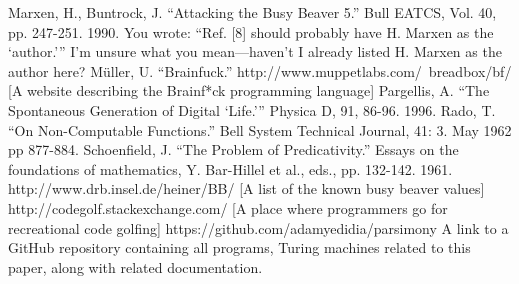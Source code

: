 \documentclass[11pt]{article}
\begin{document}
\begin{thebibliography}{100}
 Marxen, H., Buntrock, J. ``Attacking the Busy Beaver 5.'' Bull EATCS, Vol. 40, pp. 247-251. 1990. {\color{red} You wrote: ``Ref. [8] should probably have H. Marxen as the {`author.'}'' I'm unsure what you mean---haven't I already listed H. Marxen as the author here?}
 M\"uller, U. ``Brainfuck.'' http://www.muppetlabs.com/~breadbox/bf/ [A website describing the Brainf*ck programming language]
 Pargellis, A. ``The Spontaneous Generation of Digital {`Life.'}'' Physica D, 91, 86-96. 1996.
 Rado, T. ``On Non-Computable Functions.'' Bell System Technical Journal, 41: 3. May 1962 pp 877-884.
 Schoenfield, J. ``The Problem of Predicativity.'' Essays on the foundations of mathematics, Y. Bar-Hillel et al., eds., pp. 132-142. 1961.
 http://www.drb.insel.de/heiner/BB/ [A list of the known busy beaver values]
 http://codegolf.stackexchange.com/ [A place where programmers go for recreational code golfing]
 https://github.com/adamyedidia/parsimony A link to a GitHub repository containing all programs, Turing machines related to this paper, along with related documentation. 
\end{thebibliography}
\end{document}
